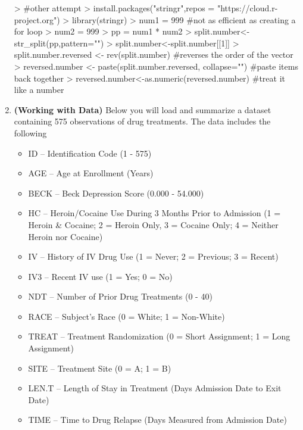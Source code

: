 \documentclass{article}
\begin{document}
\begin{enumerate}
\begin{Schunk}
\begin{Sinput}
> #other attempt
> install.packages("stringr",repos = "https://cloud.r-project.org")
> library(stringr)
> num1 = 999 #not as efficient as creating a for loop
> num2 = 999
> pp = num1 * num2 
> split.number<-str_split(pp,pattern="")
> split.number<-split.number[[1]]
> split.number.reversed <- rev(split.number) #reverses the order of the vector
> reversed.number <- paste(split.number.reversed, collapse="")   #paste items back together
> reversed.number<-as.numeric(reversed.number) #treat it like a number
\end{Sinput}
\end{Schunk}
\newpage
  \item \textbf{(Working with Data)} Below you will load and summarize a dataset 
  containing 575 observations of drug treatments. The data includes the following
  \begin{itemize}
    \item ID --	Identification Code	(1 - 575)
    \item AGE	-- Age at Enrollment	(Years)
    \item BECK -- Beck Depression Score	(0.000 - 54.000)
    \item HC --	Heroin/Cocaine Use During	3 Months Prior to Admission (1 = Heroin
    \& Cocaine; 2 = Heroin Only, 3 = Cocaine Only; 4 = Neither Heroin nor Cocaine)
    \item IV -- History of IV Drug Use	(1 = Never; 2 = Previous; 3 = Recent)
    \item IV3	-- Recent IV use	(1 = Yes; 0 = No)
    \item NDT -- Number of Prior Drug Treatments (0 - 40)
    \item RACE -- Subject's Race	(0 = White; 1 = Non-White)
    \item TREAT -- Treatment Randomization (0 = Short Assignment;	1 = Long Assignment)
    \item SITE -- Treatment Site (0 = A; 1 = B)
    \item LEN.T	-- Length of Stay in Treatment (Days Admission Date to Exit Date)	
    \item TIME -- Time to Drug Relapse (Days Measured from Admission Date)

\end{itemize}
\end{enumerate}
\end{document}
